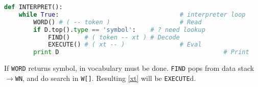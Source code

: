 
\clearpage
\begin{lstlisting}[language=Python]
def INTERPRET():
	while True:									# interpreter loop
		WORD() # ( -- token )					# Read
		if D.top().type == 'symbol':	# ? need lookup
			FIND()    # ( token -- xt )	# Decode
			EXECUTE() # ( xt -- )				# Eval
		print D												# Print
\end{lstlisting}
If \verb|WORD| returns symbol,  in vocabulary must be done.
\verb|FIND| pops  from data stack $\rightarrow$\verb|WN|, and do
search in \verb|W[]|. Resulting  \ref{xt} will be
\verb|EXECUTE|d.
